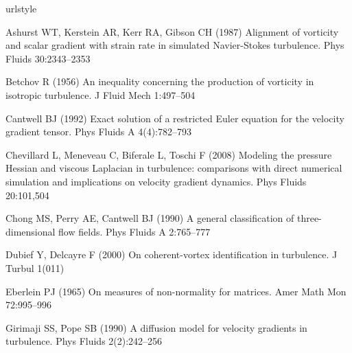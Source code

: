 \documentclass[preprint,amssymb,amsmath,aip,cha]{revtex4-1}
\begin{document}
\begin{thebibliography}{37}
\providecommand{\natexlab}[1]{#1}
\providecommand{\url}[1]{{#1}}
\providecommand{\urlprefix}{URL }
\expandafter\ifx\csname urlstyle\endcsname\relax
  \providecommand{\doi}[1]{DOI~\discretionary{}{}{}#1}\else
  \providecommand{\doi}{DOI~\discretionary{}{}{}\begingroup
  \urlstyle{rm}\Url}\fi
\providecommand{\eprint}[2][]{\url{#2}}

{Ashurst} WT, {Kerstein} AR, {Kerr} RA, {Gibson} CH (1987) Alignment of
  vorticity and scalar gradient with strain rate in simulated {N}avier-{S}tokes
  turbulence. Phys Fluids 30:2343--2353

{Betchov} R (1956) An inequality concerning the production of vorticity in
  isotropic turbulence. J Fluid Mech 1:497--504

{Cantwell} BJ (1992) Exact solution of a restricted {E}uler equation for the
  velocity gradient tensor. Phys Fluids A 4(4):782--793

{Chevillard} L, {Meneveau} C, {Biferale} L, {Toschi} F (2008) Modeling the
  pressure {H}essian and viscous {L}aplacian in turbulence: comparisons with
  direct numerical simulation and implications on velocity gradient dynamics.
  Phys Fluids 20:101,504

{Chong} MS, {Perry} AE, {Cantwell} BJ (1990) A general classification of
  three-dimensional flow fields. Phys Fluids A 2:765--777

{Dubief} Y, {Delcayre} F (2000) On coherent-vortex identification in
  turbulence. J Turbul 1(011)

{Eberlein} PJ (1965) On measures of non-normality for matrices. Amer Math Mon
  72:995--996

{Girimaji} SS, {Pope} SB (1990) A diffusion model for velocity gradients in
  turbulence. Phys Fluids 2(2):242--256


\end{thebibliography}
\end{document}
